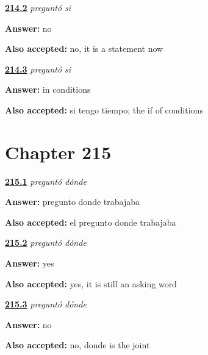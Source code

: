 \noindent\begin{minipage}[t]{\linewidth}
\raggedright
\hyperlink{review-ES-C57-pregunto-si-marks}{\textbf{214.2}} \emph{preguntó si}\par
\small \textbf{Answer:} no\par
\footnotesize \textbf{Also accepted:} no, it is a statement now
\end{minipage}\par\medskip

\noindent\begin{minipage}[t]{\linewidth}
\raggedright
\hyperlink{review-ES-C57-pregunto-si-same}{\textbf{214.3}} \emph{preguntó si}\par
\small \textbf{Answer:} in conditions\par
\footnotesize \textbf{Also accepted:} si tengo tiempo; the if of conditions
\end{minipage}\par\medskip

\section*{Chapter 215}

\noindent\begin{minipage}[t]{\linewidth}
\raggedright
\hyperlink{review-ES-C57-pregunto-donde-report}{\textbf{215.1}} \emph{preguntó dónde}\par
\small \textbf{Answer:} pregunto donde trabajaba\par
\footnotesize \textbf{Also accepted:} el pregunto donde trabajaba
\end{minipage}\par\medskip

\noindent\begin{minipage}[t]{\linewidth}
\raggedright
\hyperlink{review-ES-C57-pregunto-donde-accent}{\textbf{215.2}} \emph{preguntó dónde}\par
\small \textbf{Answer:} yes\par
\footnotesize \textbf{Also accepted:} yes, it is still an asking word
\end{minipage}\par\medskip

\noindent\begin{minipage}[t]{\linewidth}
\raggedright
\hyperlink{review-ES-C57-pregunto-donde-join}{\textbf{215.3}} \emph{preguntó dónde}\par
\small \textbf{Answer:} no\par
\footnotesize \textbf{Also accepted:} no, donde is the joint
\end{minipage}\par\medskip

